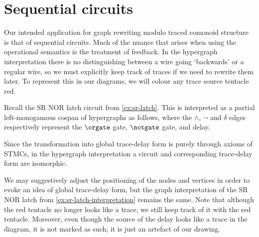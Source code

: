 \section{Sequential circuits}

Our intended application for graph rewriting modulo traced
comonoid structure is that of sequential circuits.
Much of the nuance that arises when using the operational semantics is the
treatment of feedback.
In the hypergraph interpretation there is no distinguishing between a wire going
`backwards' or a regular wire, so we must explicitly keep track of traces if we
need to rewrite them later.
To represent this in our diagrams, we will colour any trace source tentacle red.

\begin{example}\label{ex:sr-latch-interpretation}
    Recall the SR NOR latch circuit from \cref{ex:sr-latch}.
    This is interpreted as a partial left-monogamous cospan of hypergraphs as
    follows, where the \(\wedge\), \(\neg\) and \(\delta\) edges respectively
    represent the \(\orgate\) gate, \(\notgate\) gate, and delay.
    \begin{center}
    \end{center}
\end{example}

Since the transformation into global trace-delay form is purely through axioms
of STMCs, in the hypergraph interpretation a circuit and corresponding
trace-delay form are isomorphic.

\begin{example}\label{ex:graph-trace-delay}
    We may suggestively adjust the positioning of the nodes and vertices in
    order to evoke an idea of global trace-delay form, but the graph
    interpretation of the SR NOR latch from \cref{ex:sr-latch-interpretation}
    remains the same.
    Note that although the red tentacle no longer looks like a trace, we still
    keep track of it with the red tentacle.
    Moreover, even though the source of the delay looks like a trace in the
    diagram, it is not marked as such; it is just an artefact of our drawing.
    \begin{center}
    \end{center}
\end{example}

